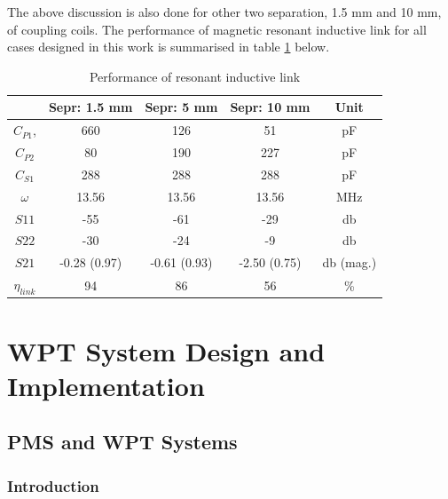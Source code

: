\documentclass[12pt,a4paper,UKenglish]{report}
\begin{document}
The above discussion is also done for other two separation, 1.5 mm and 10 mm, of coupling coils. The performance of magnetic resonant inductive link for all cases designed in this work is summarised in table \ref{tab:ant_spec} below. 

\begin{table}[H]
\caption{Performance of resonant inductive link} 
\begin{center}
\begin{tabular}{c|c|c|c|c}
\hline \hline
 								& \textbf{Sepr: 1.5 mm}	& \textbf{Sepr: 5 mm} 	& \textbf{Sepr: 10 mm}	& \textbf{Unit}		\\ \hline \hline
$C_{P1}$, 						& 660				& 126				& 51					& \si{\pico\farad}	\\ \hline
$C_{P2}$ 					 		& 80					& 190				& 227				& \si{\pico\farad}	\\ \hline
$C_{S1}$ 							& 288				&  288				& 288				& \si{\pico\farad}	\\ \hline
$\omega$							& 13.56				& 13.56				& 13.56				& \si{\mega\hertz}	\\ \hline
$S11$							& -55				& -61				& -29			  	& \si{\decibel}		\\ \hline
$S22$							& -30				& -24				& -9					& \si{\decibel} 		\\ \hline
$S21$							& -0.28 (0.97)			& -0.61 (0.93)			& -2.50 (0.75)			& \si{\decibel} (mag.)	\\ \hline
$\eta_{link}$						& 94					& 86					& 56					& \% \\		
\hline \hline
\end{tabular}
\end{center}
\label{tab:ant_spec}
\end{table}%

\clearpage
\newpage


\part{WPT System Design and Implementation} 
\chapter{PMS and WPT Systems}  
\section{Introduction}	%
\end{document}
